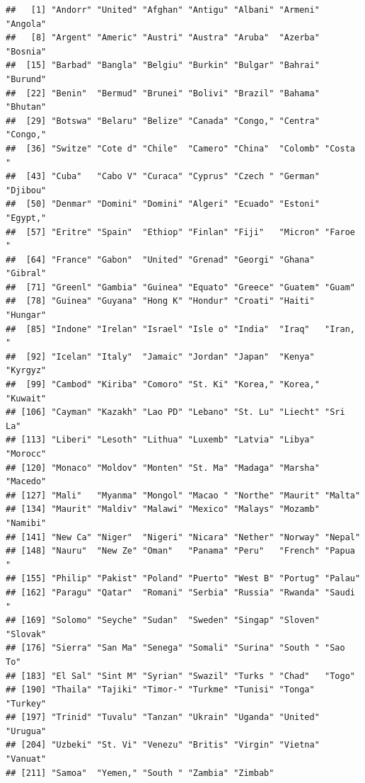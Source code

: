 \documentclass[12pt,oneside,openany]{book}
\newenvironment{Shaded}{\begin{snugshade}}{\end{snugshade}}
\newcommand{\KeywordTok}[1]{\textcolor[rgb]{0.13,0.29,0.53}{\textbf{#1}}}
\newcommand{\DataTypeTok}[1]{\textcolor[rgb]{0.13,0.29,0.53}{#1}}
\newcommand{\DecValTok}[1]{\textcolor[rgb]{0.00,0.00,0.81}{#1}}
\newcommand{\StringTok}[1]{\textcolor[rgb]{0.31,0.60,0.02}{#1}}
\newcommand{\OperatorTok}[1]{\textcolor[rgb]{0.81,0.36,0.00}{\textbf{#1}}}
\newcommand{\NormalTok}[1]{#1}
\begin{document}
\begin{Shaded}
\end{Shaded}

\begin{verbatim}
##   [1] "Andorr" "United" "Afghan" "Antigu" "Albani" "Armeni" "Angola"
##   [8] "Argent" "Americ" "Austri" "Austra" "Aruba"  "Azerba" "Bosnia"
##  [15] "Barbad" "Bangla" "Belgiu" "Burkin" "Bulgar" "Bahrai" "Burund"
##  [22] "Benin"  "Bermud" "Brunei" "Bolivi" "Brazil" "Bahama" "Bhutan"
##  [29] "Botswa" "Belaru" "Belize" "Canada" "Congo," "Centra" "Congo,"
##  [36] "Switze" "Cote d" "Chile"  "Camero" "China"  "Colomb" "Costa "
##  [43] "Cuba"   "Cabo V" "Curaca" "Cyprus" "Czech " "German" "Djibou"
##  [50] "Denmar" "Domini" "Domini" "Algeri" "Ecuado" "Estoni" "Egypt,"
##  [57] "Eritre" "Spain"  "Ethiop" "Finlan" "Fiji"   "Micron" "Faroe "
##  [64] "France" "Gabon"  "United" "Grenad" "Georgi" "Ghana"  "Gibral"
##  [71] "Greenl" "Gambia" "Guinea" "Equato" "Greece" "Guatem" "Guam"  
##  [78] "Guinea" "Guyana" "Hong K" "Hondur" "Croati" "Haiti"  "Hungar"
##  [85] "Indone" "Irelan" "Israel" "Isle o" "India"  "Iraq"   "Iran, "
##  [92] "Icelan" "Italy"  "Jamaic" "Jordan" "Japan"  "Kenya"  "Kyrgyz"
##  [99] "Cambod" "Kiriba" "Comoro" "St. Ki" "Korea," "Korea," "Kuwait"
## [106] "Cayman" "Kazakh" "Lao PD" "Lebano" "St. Lu" "Liecht" "Sri La"
## [113] "Liberi" "Lesoth" "Lithua" "Luxemb" "Latvia" "Libya"  "Morocc"
## [120] "Monaco" "Moldov" "Monten" "St. Ma" "Madaga" "Marsha" "Macedo"
## [127] "Mali"   "Myanma" "Mongol" "Macao " "Northe" "Maurit" "Malta" 
## [134] "Maurit" "Maldiv" "Malawi" "Mexico" "Malays" "Mozamb" "Namibi"
## [141] "New Ca" "Niger"  "Nigeri" "Nicara" "Nether" "Norway" "Nepal" 
## [148] "Nauru"  "New Ze" "Oman"   "Panama" "Peru"   "French" "Papua "
## [155] "Philip" "Pakist" "Poland" "Puerto" "West B" "Portug" "Palau" 
## [162] "Paragu" "Qatar"  "Romani" "Serbia" "Russia" "Rwanda" "Saudi "
## [169] "Solomo" "Seyche" "Sudan"  "Sweden" "Singap" "Sloven" "Slovak"
## [176] "Sierra" "San Ma" "Senega" "Somali" "Surina" "South " "Sao To"
## [183] "El Sal" "Sint M" "Syrian" "Swazil" "Turks " "Chad"   "Togo"  
## [190] "Thaila" "Tajiki" "Timor-" "Turkme" "Tunisi" "Tonga"  "Turkey"
## [197] "Trinid" "Tuvalu" "Tanzan" "Ukrain" "Uganda" "United" "Urugua"
## [204] "Uzbeki" "St. Vi" "Venezu" "Britis" "Virgin" "Vietna" "Vanuat"
## [211] "Samoa"  "Yemen," "South " "Zambia" "Zimbab"
\end{verbatim}
\end{document}
